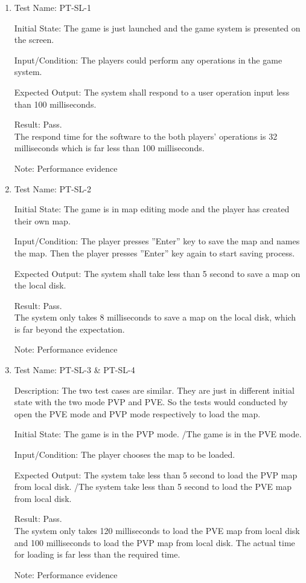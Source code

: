 \documentclass[12pt, titlepage]{article}
\begin{document}
\begin{enumerate}

\item{Test Name: PT-SL-1\\}

Initial State: The game is just launched and the game system is presented on the screen.

Input/Condition: The players could perform any operations in the game system.

Expected Output: The system shall respond to a user operation input less than 100 milliseconds.

Result: Pass. \\The respond time for the software to the both players' operations is 32 milliseconds which is far less than 100 milliseconds.

Note: Performance evidence

\item{Test Name: PT-SL-2\\}

Initial State: The game is in map editing mode and the player has created their own map.

Input/Condition: The player presses ”Enter” key to save the map and names the map. Then the player presses ”Enter” key again to start saving process.

Expected Output: The system shall take less than 5 second to save a map on the local disk.

Result: Pass. \\The system only takes 8 milliseconds to save a map on the local disk, which is far beyond the expectation.

Note: Performance evidence

\item{Test Name: PT-SL-3 \& PT-SL-4\\}

Description:  The two test cases are similar. They are just in different initial state with the two mode PVP and PVE. So the tests would conducted by open the PVE mode and PVP mode respectively to load the map.

Initial State: The game is in the PVP mode. /The game is in the PVE mode.

Input/Condition: The player chooses the map to be loaded.

Expected Output: The system take less than 5 second to load the PVP map from local disk. /The system take less than 5 second to load the PVE map from local disk.

Result: Pass. \\The system only takes 120 milliseconds to load the PVE map from local disk and 100 milliseconds to load the PVP map from local disk. The actual time for loading is far less than the required time.

Note: Performance evidence
\end{enumerate}
\end{document}
